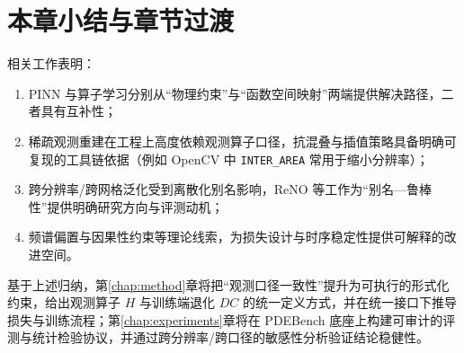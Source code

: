 \section{本章小结与章节过渡}\label{sec:rw_summary}

相关工作表明：
\begin{enumerate}
  \item PINN 与算子学习分别从“物理约束”与“函数空间映射”两端提供解决路径，二者具有互补性\cite{raissi2019pinn,kovachki2023neural_operator}；
  \item 稀疏观测重建在工程上高度依赖观测算子口径，抗混叠与插值策略具备明确可复现的工具链依据（例如 OpenCV 中 \texttt{INTER\_AREA} 常用于缩小分辨率）\cite{opencv_resize}；
  \item 跨分辨率/跨网格泛化受到离散化别名影响，ReNO 等工作为“别名—鲁棒性”提供明确研究方向与评测动机\cite{bartolucci2023reno}；
  \item 频谱偏置与因果性约束等理论线索，为损失设计与时序稳定性提供可解释的改进空间\cite{liu2025diminishing_spectral_bias,wang2022causality_pinn}。
\end{enumerate}

基于上述归纳，第\ref{chap:method}章将把“观测口径一致性”提升为可执行的形式化约束，给出观测算子 $H$ 与训练端退化 $DC$ 的统一定义方式，并在统一接口下推导损失与训练流程；第\ref{chap:experiments}章将在 PDEBench 底座上构建可审计的评测与统计检验协议，并通过跨分辨率/跨口径的敏感性分析验证结论稳健性\cite{takamoto2022pdebench}。
